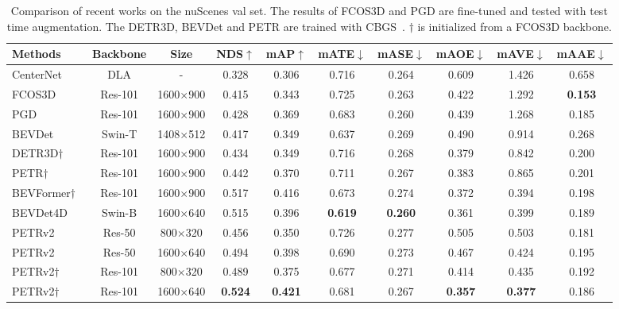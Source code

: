 \documentclass[10pt,twocolumn,letterpaper]{article}
\begin{document}
\begin{table*}[t!]
\begin{center}
\caption{Comparison of recent works on the nuScenes val set. The results of FCOS3D and PGD are fine-tuned and tested with test time augmentation. The DETR3D, BEVDet and PETR are trained with CBGS~\cite{zhu2019class}. $\dagger$ is initialized from a FCOS3D backbone.
}
\label{table:1}
\begin{tabular}{l|cc|ccccccc}
\hline
Methods & Backbone & Size  & NDS$\uparrow$ & mAP$\uparrow$ & mATE$\downarrow$ & mASE$\downarrow$ & mAOE$\downarrow$ & mAVE$\downarrow$ & mAAE$\downarrow$ \\

\hline
CenterNet~\cite{zhou2019objects}&DLA  &  - &0.328 &0.306 &0.716 &0.264 &0.609 &1.426 &0.658   \\
 FCOS3D~\cite{wang2021fcos3d}  &Res-101  & 1600$\times$900  &0.415 &0.343 &0.725 &0.263 &0.422 &1.292 &\textbf{0.153} \\
 PGD~\cite{wang2022pgd} &Res-101 & 1600$\times$900  &0.428 &0.369  &0.683 &0.260 &0.439 &1.268 &0.185  \\
BEVDet~\cite{huang2021bevdet} &Swin-T & 1408$\times$512  &0.417 &0.349 &0.637 &0.269 &0.490 &0.914 &0.268 \\
DETR3D$\dagger$~\cite{wang2022detr3d} &Res-101  & 1600$\times$900  &0.434 &0.349 &0.716 &0.268 &0.379 &0.842 &0.200 \\
PETR$\dagger$~\cite{liu2022petr}  &Res-101 & 1600$\times$900 &0.442 &0.370 &0.711 &0.267 &0.383 &  0.865 & 0.201 \\
\hline
BEVFormer$\dagger$~\cite{li2022bevformer}  &Res-101 & 1600$\times$900 &0.517 &0.416 &0.673 &0.274 &0.372 &0.394 &0.198 \\
BEVDet4D~\cite{huang2022bevdet4d}  &Swin-B & 1600$\times$640 &0.515 &0.396 &\textbf{0.619} &\textbf{0.260} &0.361 &0.399 &0.189 \\
PETRv2 &Res-50 & 800$\times$320 &0.456 &0.350 &0.726 &0.277 &0.505 &0.503 &0.181 \\
PETRv2 &Res-50 & 1600$\times$640 &0.494 &0.398 &0.690 &0.273 &0.467 &0.424 &0.195 \\
PETRv2$\dagger$  &Res-101 & 800$\times$320 &0.489 &0.375 &0.677 &0.271 &0.414 &0.435 &0.192 \\
PETRv2$\dagger$  &Res-101 & 1600$\times$640 &\textbf{0.524} &\textbf{0.421} &0.681 &0.267 &\textbf{0.357} &\textbf{0.377} &0.186 \\
\hline
\end{tabular}
\end{center}

\end{table*}
\setlength{\tabcolsep}{1pt}
\end{document}
